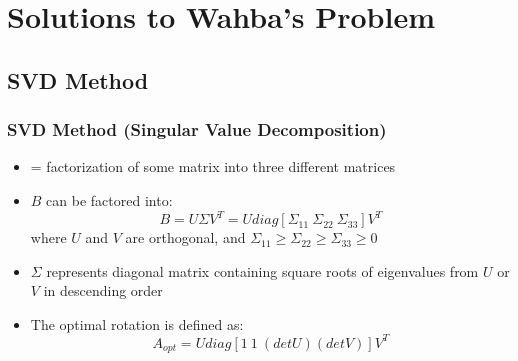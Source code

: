 \documentclass[11pt]{beamer}
\begin{document}
    \section{Solutions to Wahba's Problem}\label{sec:wahbasProblemSolutions}
    \subsection{SVD Method}\label{subsec:svdMethod}
    \begin{frame}
        \frametitle{SVD Method (Singular Value Decomposition)}
        \begin{itemize}[<+->]
            \item  = factorization of some matrix into three different matrices \medskip
            \item $B$ can be factored into:
            \begin{equation}
                B = U \Sigma V^T = U diag \left[ \Sigma_{11} \ \Sigma_{22} \ \Sigma_{33} \right] V^T
            \end{equation}
            where $U$ and $V$ are orthogonal, and $\Sigma_{11} \geq \Sigma_{22} \geq \Sigma_{33} \geq 0$ \medskip
            \item $\Sigma$ represents diagonal matrix containing square roots of eigenvalues from $U$ or $V$ in
            descending order \medskip
            \item The optimal rotation is defined as:
            \begin{equation}
                A_{opt} = U diag \left[ 1 \ 1 \ (\mathit{det} U)(\mathit{det} V) \right] V^T
            \end{equation}
        \end{itemize}
    \end{frame}
\end{document}

